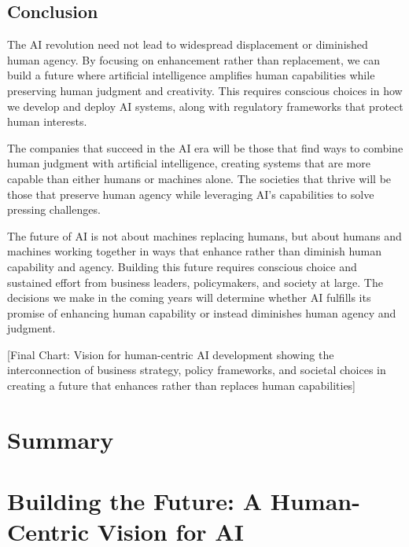 \documentclass[
  Letterpaper,
]{scrbook}
\begin{document}
\section{Conclusion}\label{conclusion-3}

The AI revolution need not lead to widespread displacement or diminished
human agency. By focusing on enhancement rather than replacement, we can
build a future where artificial intelligence amplifies human
capabilities while preserving human judgment and creativity. This
requires conscious choices in how we develop and deploy AI systems,
along with regulatory frameworks that protect human interests.

The companies that succeed in the AI era will be those that find ways to
combine human judgment with artificial intelligence, creating systems
that are more capable than either humans or machines alone. The
societies that thrive will be those that preserve human agency while
leveraging AI's capabilities to solve pressing challenges.

The future of AI is not about machines replacing humans, but about
humans and machines working together in ways that enhance rather than
diminish human capability and agency. Building this future requires
conscious choice and sustained effort from business leaders,
policymakers, and society at large. The decisions we make in the coming
years will determine whether AI fulfills its promise of enhancing human
capability or instead diminishes human agency and judgment.

{[}Final Chart: Vision for human-centric AI development showing the
interconnection of business strategy, policy frameworks, and societal
choices in creating a future that enhances rather than replaces human
capabilities{]}


\chapter*{Summary}\label{summary}



\chapter*{Building the Future: A Human-Centric Vision for
AI}\label{building-the-future-a-human-centric-vision-for-ai-1}
\end{document}
